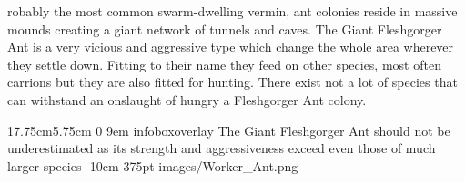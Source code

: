 \documentclass[letterpaper,openany,twoside,twocolumn]{book}
\begin{document}

\MonsterSheetGeometry

\mainmatter%



\entryfont \noindent {}robably the most common swarm-dwelling vermin, ant colonies reside in massive mounds creating a giant network of tunnels and caves. The Giant Fleshgorger Ant is a very vicious and aggressive type which change the whole area wherever they settle down. Fitting to their name they feed on other species,  most often carrions but they are also fitted for hunting. There exist not a lot of species that can withstand an onslaught of hungry a Fleshgorger Ant colony.
\vspace*{6cm}

\MonsterGraphicAndShortInfo%
	{17.75cm}{5.75cm}%
	{0}%
	{9em}%
	{infoboxoverlay} %
	{The Giant Fleshgorger Ant should not be underestimated as its strength and aggressiveness exceed even those of much larger species}%
	{-10cm}%
	{375pt}%
	{images/Worker_Ant.png}%
	
\end{document}
